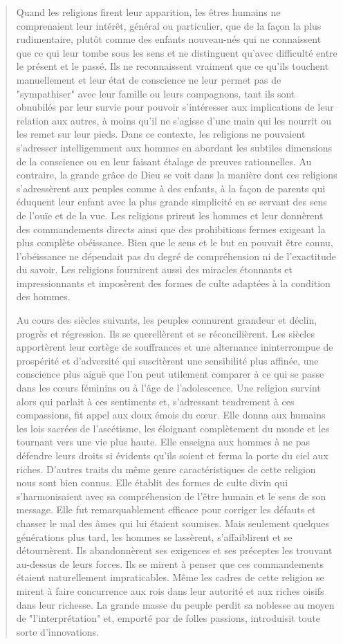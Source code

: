 \begin{quote}
Quand les religions firent leur apparition, les êtres humains ne
comprenaient leur intérêt, général ou particulier, que de la façon la
plus rudimentaire, plutôt comme des enfants nouveau-nés qui ne
connaissent que ce qui leur tombe sous les sens et ne distinguent
qu'avec difficulté entre le présent et le passé. Ils ne reconnaissent
vraiment que ce qu'ils touchent manuellement et leur état de conscience
ne leur permet pas de "sympathiser" avec leur famille ou leurs
compagnons, tant ils sont obnubilés par leur survie pour pouvoir
s'intéresser aux implications de leur relation aux autres, à moins qu'il
ne s'agisse d'une main qui les nourrit ou les remet sur leur pieds. Dans
ce contexte, les religions ne pouvaient s'adresser intelligemment aux
hommes en abordant les subtiles dimensions de la conscience ou en leur
faisant étalage de preuves rationnelles. Au contraire, la grande grâce
de Dieu se voit dans la manière dont ces religions s'adressèrent aux
peuples comme à des enfants, à la façon de parents qui éduquent leur
enfant avec la plus grande simplicité en se servant des sens de l'ouïe
et de la vue. Les religions prirent les hommes et leur donnèrent des
commandements directs ainsi que des prohibitions fermes exigeant la plus
complète obéissance. Bien que le sens et le but en pouvait être connu,
l'obéissance ne dépendait pas du degré de compréhension ni de
l'exactitude du savoir. Les religions fournirent aussi des miracles
étonnants et impressionnants et imposèrent des formes de culte adaptées
à la condition des hommes.

Au cours des siècles suivants, les peuples connurent grandeur et déclin,
progrès et régression. Ils se querellèrent et se réconcilièrent. Les
siècles apportèrent leur cortège de souffrances et une alternance
ininterrompue de prospérité et d'adversité qui suscitèrent une
sensibilité plus affinée, une conscience plus aiguë que l'on peut
utilement comparer à ce qui se passe dans les cœurs féminins ou à l'âge
de l'adolescence. Une religion survint alors qui parlait à ces
sentiments et, s'adressant tendrement à ces compassions, fit appel aux
doux émois du cœur. Elle donna aux humains les lois sacrées de
l'ascétisme, les éloignant complètement du monde et les tournant vers
une vie plus haute. Elle enseigna aux hommes à ne pas défendre leurs
droits si évidents qu'ils soient et ferma la porte du ciel aux riches.
D'autres traits du même genre caractéristiques de cette religion nous
sont bien connus. Elle établit des formes de culte divin qui
s'harmonisaient avec sa compréhension de l'être humain et le sens de son
message. Elle fut remarquablement efficace pour corriger les défauts et
chasser le mal des âmes qui lui étaient soumises. Mais seulement
quelques générations plus tard, les hommes se lassèrent, s'affaiblirent
et se détournèrent. Ils abandonnèrent ses exigences et ses préceptes les
trouvant au-dessus de leurs forces. Ils se mirent à penser que ces
commandements étaient naturellement impraticables. Même les cadres de
cette religion se mirent à faire concurrence aux rois dans leur autorité
et aux riches oisifs dans leur richesse. La grande masse du peuple
perdit sa noblesse au moyen de "l'interprétation" et, emporté par de
folles passions, introduisit toute sorte d'innovations.


\end{quote}
